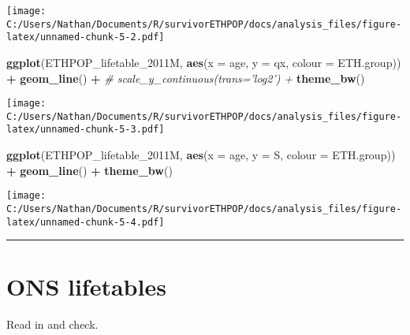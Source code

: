 \documentclass[
]{article}
\newenvironment{Shaded}{\begin{snugshade}}{\end{snugshade}}
\newcommand{\CommentTok}[1]{\textcolor[rgb]{0.56,0.35,0.01}{\textit{#1}}}
\newcommand{\DataTypeTok}[1]{\textcolor[rgb]{0.13,0.29,0.53}{#1}}
\newcommand{\KeywordTok}[1]{\textcolor[rgb]{0.13,0.29,0.53}{\textbf{#1}}}
\newcommand{\NormalTok}[1]{#1}
\newcommand{\OperatorTok}[1]{\textcolor[rgb]{0.81,0.36,0.00}{\textbf{#1}}}
\newcommand{\StringTok}[1]{\textcolor[rgb]{0.31,0.60,0.02}{#1}}
\begin{document}
\texttt{[image: C:/Users/Nathan/Documents/R/survivorETHPOP/docs/analysis\_files/figure-latex/unnamed-chunk-5-2.pdf]}

\begin{Shaded}
\begin{Highlighting}[]
\KeywordTok{ggplot}\NormalTok{(ETHPOP_lifetable_2011M, }\KeywordTok{aes}\NormalTok{(}\DataTypeTok{x =}\NormalTok{ age, }\DataTypeTok{y =}\NormalTok{ qx, }\DataTypeTok{colour =}\NormalTok{ ETH.group)) }\OperatorTok{+}
\StringTok{  }\KeywordTok{geom_line}\NormalTok{() }\OperatorTok{+}
\StringTok{  }\CommentTok{# scale_y_continuous(trans='log2') +}
\StringTok{  }\KeywordTok{theme_bw}\NormalTok{()}
\end{Highlighting}
\end{Shaded}

\texttt{[image: C:/Users/Nathan/Documents/R/survivorETHPOP/docs/analysis\_files/figure-latex/unnamed-chunk-5-3.pdf]}

\begin{Shaded}
\begin{Highlighting}[]
\KeywordTok{ggplot}\NormalTok{(ETHPOP_lifetable_2011M, }\KeywordTok{aes}\NormalTok{(}\DataTypeTok{x =}\NormalTok{ age, }\DataTypeTok{y =}\NormalTok{ S, }\DataTypeTok{colour =}\NormalTok{ ETH.group)) }\OperatorTok{+}
\StringTok{  }\KeywordTok{geom_line}\NormalTok{() }\OperatorTok{+}
\StringTok{  }\KeywordTok{theme_bw}\NormalTok{()}
\end{Highlighting}
\end{Shaded}

\texttt{[image: C:/Users/Nathan/Documents/R/survivorETHPOP/docs/analysis\_files/figure-latex/unnamed-chunk-5-4.pdf]}

\begin{center}\rule{0.5\linewidth}{0.5pt}\end{center}

\hypertarget{ons-lifetables}{%
\section{ONS lifetables}\label{ons-lifetables}}

Read in and check.
\end{document}
